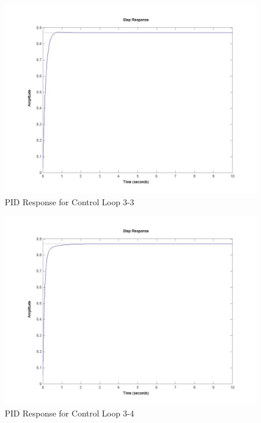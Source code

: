 	\begin{figure}[H]
		\includegraphics[width=\textwidth]{part3-3.jpg}
		\caption{PID Response for Control Loop 3-3}
	\end{figure}
	
	\begin{figure}[H]
		\includegraphics[width=\textwidth]{part3-4.jpg}
		\caption{PID Response for Control Loop 3-4}
	\end{figure}
	

